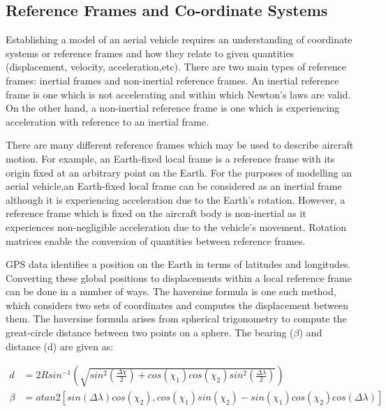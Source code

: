 \subsection{Reference Frames and Co-ordinate Systems}\label{section:RefFrames}
Establishing a model of an aerial vehicle requires an understanding of coordinate systems or reference frames and how they relate to given quantities (displacement, velocity, acceleration,etc). There are two main types of reference frames: inertial frames and non-inertial reference frames. An inertial reference frame is one which is not accelerating and within which Newton's laws are valid\cite{Nebylov2016}. On the other hand, a non-inertial reference frame is one which is experiencing acceleration with reference to an inertial frame.

There are many different reference frames which may be used to describe aircraft motion. For example, an Earth-fixed local frame is a reference frame with its origin fixed at an arbitrary point on the Earth. For the purposes of modelling an aerial vehicle,an Earth-fixed local frame can be considered as an inertial frame although it is experiencing acceleration due to the Earth's rotation. However, a reference frame which is fixed on the aircraft body is non-inertial as it experiences non-negligible acceleration due to the vehicle's movement. Rotation matrices enable the conversion of quantities between reference frames.

GPS data identifies a position on the Earth in terms of latitudes and longitudes. Converting these global positions to displacements within a local reference frame can be done in a number of ways. The haversine formula is one such method, which considers two sets of coordinates and computes the displacement between them. The haversine formula arises from spherical trigonometry to compute the great-circle distance between two points on a sphere. The bearing ($\beta$) and distance (d) are given as:

\begin{equation}\label{eqn:haversine}
\begin{split}
d&=2R sin^{-1} \left( \sqrt{sin^{2}\left( \frac{\Delta\chi}{2} \right) +cos(\chi_{1})cos(\chi_{2})sin^{2} \left( \frac{\Delta\lambda}{2}  \right) }\right)\\
\beta&=atan2\left[ sin(\Delta\lambda)cos(\chi_{2}) , cos(\chi_{1})sin(\chi_{2}) - sin(\chi_{1}) cos(\chi_2) cos(\Delta\lambda)\right]
\end{split}
\end{equation}

